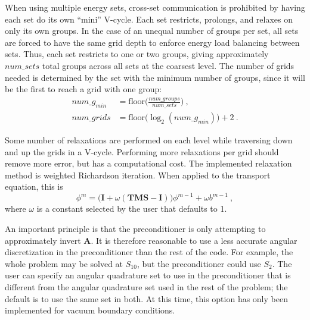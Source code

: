 \documentclass[preprint,12pt]{elsarticle}
\newcommand{\ve}[1]{\ensuremath{\mathbf{#1}}}
\begin{document}
When using multiple energy sets, cross-set communication is prohibited by having each set do its own ``mini'' V-cycle. Each set restricts, prolongs, and relaxes on only its own groups. In the case of an unequal number of groups per set, all sets are forced to have the same grid depth to enforce energy load balancing between sets. Thus, each set restricts to one or two groups, giving approximately $num\_sets$ total groups across all sets at the coarsest level. The number of grids needed is determined by the set with the minimum number of groups, since it will be the first to reach a grid with one group:%
\begin{align}
  num\_g_{min} &= \text{floor}\bigl(\frac{num\_groups}{num\_sets}\bigr) \:, \\
  num\_grids &= \text{floor}\bigl( \log_{2}(num\_g_{min}) \bigr) + 2 \:.
  \label{eq:multisetGrids}
\end{align}

Some number of relaxations are performed on each level while traversing down and up the grids in a V-cycle. Performing more relaxations per grid should remove more error, but has a computational cost. The implemented relaxation method is weighted Richardson iteration. When applied to the transport equation, this is
%
\begin{equation}
  \phi^{m} = \bigr(\ve{I} + \omega(\ve{TMS} - \ve{I})\bigl)\phi^{m-1} + \omega b^{m-1} \:,
  \label{eq:relax}
 \end{equation}
%
where $\omega$ is a constant selected by the user that defaults to 1. 

An important principle is that the preconditioner is only attempting to approximately invert $\ve{A}$. It is therefore reasonable to use a less accurate angular discretization in the preconditioner than the rest of the code. For example, the whole problem may be solved at $S_{10}$, but the preconditioner could use $S_{2}$. The user can specify an angular quadrature set to use in the preconditioner that is different from the angular quadrature set used in the rest of the problem; the default is to use the same set in both. At this time, this option has only been implemented for vacuum boundary conditions. 

\end{document}
